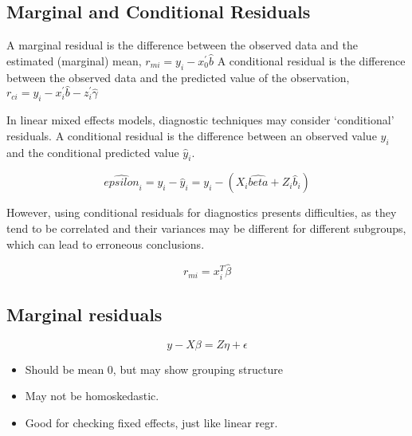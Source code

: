 \documentclass[Main.tex]{subfiles}
\begin{document}
	\subsection{Marginal and Conditional Residuals}
	
	A marginal residual is the difference between the observed data and the estimated (marginal) mean, $r_{mi} = y_i - x_0^{\prime} \hat{b}$
	A conditional residual is the difference between the observed data and the predicted value of the observation,
	$r_{ci} = y_i - x_i^{\prime} \hat{b} - z_i^{\prime} \hat{\gamma}$
	
	In linear mixed effects models, diagnostic techniques may consider `conditional' residuals. A conditional residual is the difference between an observed value $y_{i}$ and the conditional predicted value $\hat{y}_{i} $.
	
	\[ \hat{epsilon}_{i} = y_{i} - \hat{y}_{i} = y_{i} - ( X_{i}\hat{beta} + Z_{i}\hat{b}_{i}) \]
	
	However, using conditional residuals for diagnostics presents difficulties, as they tend to be correlated and their variances may be different for different subgroups, which can lead to erroneous conclusions.
	
	
	
	\begin{equation}
	r_{mi}=x^{T}_{i}\hat{\beta}
	\end{equation}
		
\newpage

\subsection{Marginal residuals}

\[y - X\beta = Z \eta +\epsilon \]
\begin{itemize}
	\item
	Should be mean 0, but may show grouping structure
	\item
	May not be homoskedastic.
	\item
	Good for checking fixed effects, just like linear regr.
\end{itemize}
\end{document}
